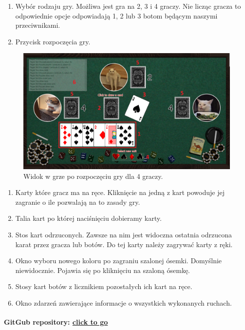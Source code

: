 \documentclass[12pt]{article}
\begin{document}
	\begin{enumerate}
		\item Wybór rodzaju gry. Możliwa jest gra na 2, 3 i 4 graczy. Nie licząc gracza to odpowiednie opcje odpowiadają 1, 2 lub 3 botom będącym naszymi przeciwnikami.
		\item Przycisk rozpoczęcia gry.
	\end{enumerate}

	\begin{figure}[h]
		\centering
		\renewcommand*{\figurename}{Fig.} 
		\includegraphics[width=\textwidth]{img/game.png}
		\caption{Widok w grze po rozpoczęciu gry dla 4 graczy.}
		\label{}
	\end{figure}

	\begin{enumerate}
		\item Karty które gracz ma na ręce. Kliknięcie na jedną z kart powoduje jej zagranie o ile pozwalają na to zasady gry.
		\item Talia kart po której naciśnięciu dobieramy karty.
		\item Stos kart odrzuconych. Zawsze na nim jest widoczna ostatnia odrzucona karat przez gracza lub botów. Do tej karty należy zagrywać karty z ręki.
		\item Okno wyboru nowego koloru po zagraniu szalonej ósemki. Domyślnie niewidocznie. Pojawia się po kliknięciu na szaloną ósemkę.
		\item Stosy kart botów z licznikiem pozostałych ich kart na ręce.
		\item Okno zdarzeń zawierające informacje o wszystkich wykonanych ruchach.
	\end{enumerate}

	\paragraph{GitGub repository: \href{https://github.com/GrzegorzStefanski-ib/CrazyEights.git}{click to go}} 
	
\end{document}
